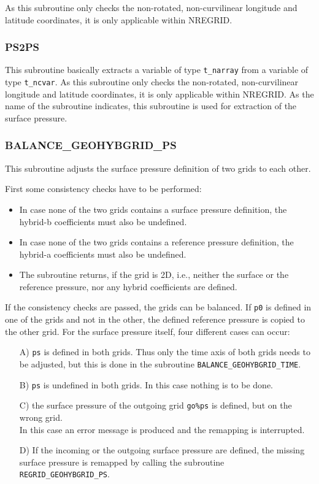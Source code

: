 \documentclass[11pt,twoside]{article}
\begin{document}
As this subroutine only checks the non-rotated, non-curvilinear
longitude and latitude coordinates, it is only applicable within NREGRID.

 \subsubsection{PS2PS\label{PS2PS}}
This subroutine basically extracts a variable of type \verb|t_narray| from
a variable of type \verb|t_ncvar|.
As this subroutine only checks the non-rotated, non-curvilinear
longitude and latitude coordinates, it is only applicable within NREGRID.
As the name of the subroutine indicates, this subroutine is used for
extraction of the surface pressure.

\subsubsection{BALANCE\_GEOHYBGRID\_PS\label{BALGRIDPS}}
This subroutine  adjusts the surface pressure definition of two grids to each
other. 

First some consistency checks have to be performed:
\begin{itemize}
\item In case none of the two grids contains a surface pressure definition,
 the hybrid-b coefficients must also be undefined.
\item In case none of the two grids contains a reference pressure definition,
 the hybrid-a coefficients must also be undefined.
\item The subroutine returns, if the grid is 2D, i.e., neither
the surface or the reference pressure, nor any hybrid coefficients are defined.
\end{itemize}

If the consistency checks are passed, the grids can be balanced.
If \verb|p0| is defined in one of the grids and not in the other, the defined
reference pressure is copied to the other grid.
For the surface pressure itself, four different cases can occur:
\begin{enumerate}
\item[A)] \verb|ps| is defined in both grids. Thus only the time axis of both
grids needs to be adjusted, but this is done in the
subroutine \verb|BALANCE_GEOHYBGRID_TIME|. 
\item[B)] \verb|ps| is undefined in both grids. In this case nothing
is to be done.
\item[C)] the surface pressure of the outgoing grid \verb|go%ps| is defined,
but on the wrong grid. \\
In this case an error message is produced and the remapping is
interrupted.
\item[D)] If the incoming or the outgoing surface pressure are defined, the
missing surface pressure is remapped by calling the
subroutine \verb|REGRID_GEOHYBGRID_PS|. 
\end{enumerate}
\end{document}

